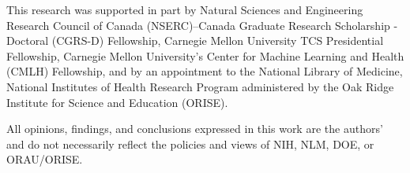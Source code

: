 This research was supported in part by 
Natural Sciences and Engineering Research Council of Canada (NSERC)--Canada Graduate Research Scholarship - Doctoral (CGRS-D) Fellowship, 
Carnegie Mellon University TCS Presidential Fellowship, 
Carnegie Mellon University's Center for Machine Learning and Health (CMLH) Fellowship, and by an appointment to the National Library of Medicine, National Institutes of Health Research Program administered by the Oak Ridge Institute for Science and Education (ORISE).

All opinions, findings, and conclusions expressed in this work are the authors' and do not necessarily reflect the policies and views of NIH, NLM, DOE, or ORAU/ORISE.
